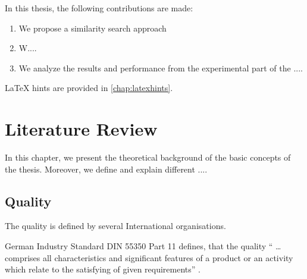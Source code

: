 In this thesis, the following contributions are made:
\begin{enumerate}

\item We propose a similarity search approach 

\item  W....

\item  We analyze the results and performance from the experimental part of the ....

\end{enumerate}











LaTeX hints are provided in \autoref{chap:latexhints}.

\chapter{Literature Review}
In this chapter, we present the theoretical background of the basic concepts of the thesis. Moreover, we define and explain different ....


\section{Quality}
The quality is defined by several International organisations.

German Industry Standard DIN 55350 Part 11 defines, that the quality “ … comprises all characteristics and significant features of a product or an activity which relate to the satisfying of given requirements” \cite{fitzpatrick1996software}.


